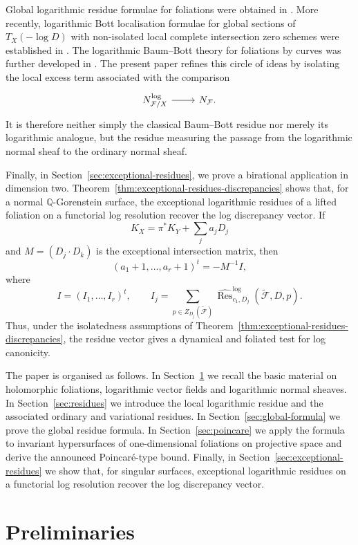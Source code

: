 \documentclass[12pt,reqno,a4paper]{amsart}
\numberwithin{equation}{section}
\theoremstyle{plain}
\theoremstyle{definition}
\newcommand{\cF}{\mathcal{F}}
\begin{document}
Global logarithmic residue formulae for foliations were obtained in
\cite{CoMa1,CoMa3}. More recently, logarithmic Bott localisation formulae for
global sections of \(T_X(-\log D)\) with non-isolated local complete
intersection zero schemes were established in \cite{CaEla}. The logarithmic
Baum--Bott theory for foliations by curves was further developed in
\cite{CoLoMa}. The present paper refines this circle of ideas by isolating the
local excess term associated with the comparison
\[
\begin{tikzcd}
N_{\cF/X}^{\log} \arrow[r] & N_{\cF}.
\end{tikzcd}
\]
It is therefore neither simply the classical Baum--Bott residue nor merely its
logarithmic analogue, but the residue measuring the passage from the
logarithmic normal sheaf to the ordinary normal sheaf.

Finally, in Section~\ref{sec:exceptional-residues}, we prove a birational
application in dimension two. Theorem~\ref{thm:exceptional-residues-discrepancies}
shows that, for a normal \(\mathbb Q\)-Gorenstein surface, the exceptional
logarithmic residues of a lifted foliation on a functorial log resolution
recover the log discrepancy vector. If
\[
K_X=\pi^*K_Y+\sum_j a_jD_j
\]
and \(M=(D_j\cdot D_k)\) is the exceptional intersection matrix, then
\[
(a_1+1,\ldots,a_r+1)^t=-M^{-1}I,
\]
where
\[
I=(I_1,\ldots,I_r)^t,
\qquad
I_j=
\sum_{p\in Z_{D_j}(\widetilde{\cF})}
\widehat{\operatorname{Res}}^{\log}_{c_1,D_j}
(\widetilde{\cF},D,p).
\]
Thus, under the isolatedness assumptions of
Theorem~\ref{thm:exceptional-residues-discrepancies}, the residue vector gives a
dynamical and foliated test for log canonicity.

The paper is organised as follows. In Section~\ref{sec:preliminaries} we recall
the basic material on holomorphic foliations, logarithmic vector fields and
logarithmic normal sheaves. In Section~\ref{sec:residues} we introduce the
local logarithmic residue and the associated ordinary and variational residues.
In Section~\ref{sec:global-formula} we prove the global residue formula. In
Section~\ref{sec:poincare} we apply the formula to invariant hypersurfaces of
one-dimensional foliations on projective space and derive the announced
Poincar\'e-type bound. Finally, in Section~\ref{sec:exceptional-residues} we
show that, for singular surfaces, exceptional logarithmic residues on a
functorial log resolution recover the log discrepancy vector.


\section{Preliminaries}\label{sec:preliminaries}
\end{document}
